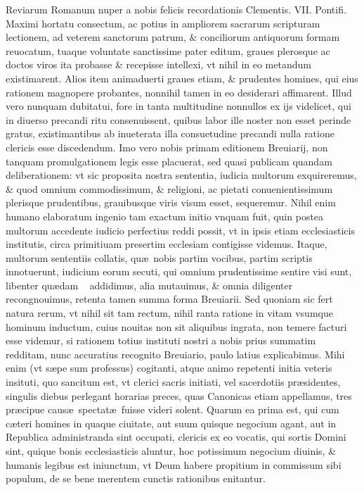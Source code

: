 \documentclass[a5paper,10pt]{book}
\def\ae{æ}
\begin{document}
{}Reviarum Romanum nuper a nobis felicis recordationis Clementis. VII. Pontifi. Maximi hortatu consectum, ac potius in ampliorem sacrarum scripturam lectionem, ad veterem sanctorum patrum, \& conciliorum antiquorum formam reuocatum, tuaque voluntate sanctissime pater editum, graues plerosque ac doctos viros ita probasse \& recepisse intellexi, vt nihil in eo metandum existimarent.
Alios item animaduerti graues etiam, \& prudentes homines, qui eius rationem magnopere probantes, nonnihil tamen in eo desiderari affimarent.
Illud vero nunquam dubitatui, fore in tanta multitudine nonnullos ex ijs videlicet, qui in diuerso precandi ritu consenuissent, quibus labor ille noster non esset perinde gratus, existimantibus ab inueterata illa consuetudine precandi nulla ratione clericis esse discedendum.
Imo vero nobis primam editionem Breuiarij, non tanquam promulgationem legis esse placuerat, sed quasi publicam quandam deliberationem:
vt sic proposita nostra sententia, iudicia multorum exquireremus, \& quod omnium commodissimum, \& religioni, ac pietati conuenientissimum plerisque prudentibus, grauibusque viris visum esset, sequeremur.
Nihil enim humano elaboratum ingenio tam exactum initio vnquam fuit, quin postea multorum accedente iudicio perfectius reddi possit, vt in ipsis etiam ecclesiasticis institutis, circa primitiuam presertim ecclesiam contigisse videmus.
Itaque, multorum sententiis 
collatis, qu\ae \ nobis partim vocibus, partim scriptis innotuerunt, iudicium eorum secuti, qui omnium prudentissime sentire visi sunt, libenter qu\ae dam \ %
addidimus, alia mutauimus, \& omnia diligenter recongnouimus, retenta tamen summa forma Breuiarii.
Sed quoniam sic fert natura rerum, vt nihil sit tam rectum, nihil ranta ratione in vitam vsumque hominum inductum, cuius nouitas non sit aliquibus ingrata, non temere facturi esse videmur, si rationem totius instituti nostri a nobis prius summatim redditam, nunc accuratius recognito Breuiario, paulo latius explicabimus.
Mihi enim (vt s\ae pe sum professus) cogitanti, atque animo repetenti initia veteris insituti, quo sancitum est, vt clerici sacris initiati, vel sacerdotiis pr\ae sidentes, singulis diebus perlegant horarias preces, quas Canonicas etiam appellamus, tres pr\ae cipue caus\ae \ spectat\ae \ fuisse videri solent.
Quarum ea prima est, qui cum c\ae teri homines in quaque ciuitate, aut suum quisque negocium agant, aut in Republica administranda sint occupati, clericis ex eo vocatis, qui sortis Domini sint, quique bonis ecclesiasticis aluntur, hoc potissimum negocium diuinis, \& humanis legibus est iniunctum, vt Deum habere propitium in commissum sibi populum, de se bene merentem cunctis rationibus enitantur.
\end{document}
